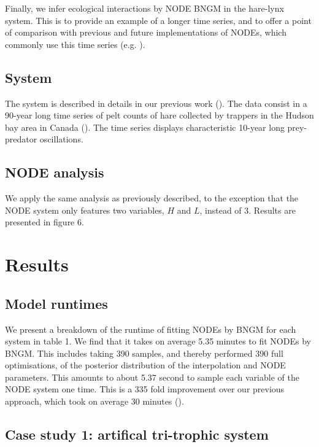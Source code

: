 \documentclass[11pt, oneside]{article}
\begin{document}
Finally, we infer ecological interactions by NODE BNGM in the hare-lynx system.
This is to provide an example of a longer time series, and to offer a point of comparison with previous and future implementations of NODEs, which commonly use this time series (e.g. \cite{Bonnaffe2021a}).

\subsection{System}

The system is described in details in our previous work (\cite{Bonnaffe2021a}).
The data consist in a 90-year long time series of pelt counts of hare collected by trappers in the Hudson bay area in Canada (\cite{Odum1972}).
The time series displays characteristic 10-year long prey-predator oscillations.

\subsection{NODE analysis}

We apply the same analysis as previously described, to the exception that the NODE system only features two variables, $H$ and $L$, instead of 3.
Results are presented in figure 6.

\section{Results}

\subsection{Model runtimes}

We present a breakdown of the runtime of fitting NODEs by BNGM for each system in table 1.
We find that it takes on average 5.35 minutes to fit NODEs by BNGM.
This includes taking 390 samples, and thereby performed 390 full optimisations, of the posterior distribution of the interpolation and NODE parameters. 
This amounts to about 5.37 second to sample each variable of the NODE system one time.
This is a 335 fold improvement over our previous approach, which took on average 30 minutes (\cite{Bonnaffe2021a}).

\subsection{Case study 1: artifical tri-trophic system}
\end{document}
